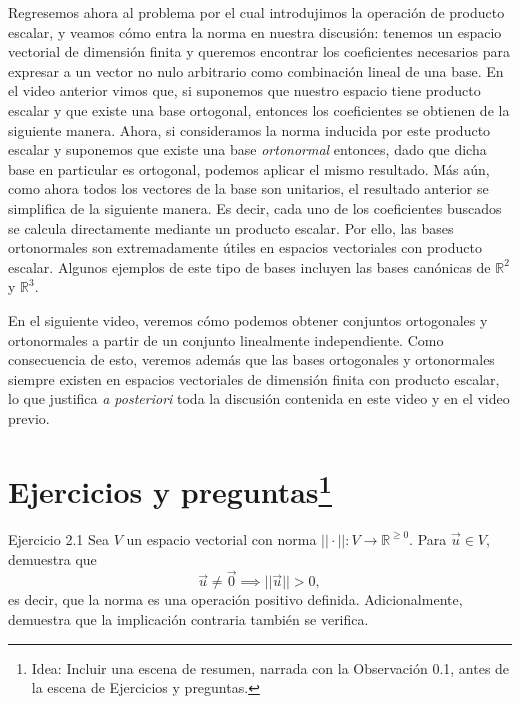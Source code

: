 \documentclass[12pt,dvipsnames]{article}
\numberwithin{equation}{section}
\begin{document}
Regresemos ahora al problema por el cual introdujimos la operación de producto escalar, y veamos cómo entra la norma en nuestra discusión: tenemos un espacio vectorial de dimensión finita y queremos encontrar los coeficientes necesarios para expresar a un vector no nulo arbitrario como combinación lineal de una base. En el video anterior vimos que, si suponemos que nuestro espacio tiene producto escalar y que existe una base ortogonal, entonces los coeficientes se obtienen de la siguiente manera. Ahora, si consideramos la norma inducida por este producto escalar y suponemos que existe una base \emph{ortonormal} entonces, dado que dicha base en particular es ortogonal, podemos aplicar el mismo resultado. Más aún, como ahora todos los vectores de la base son unitarios, el resultado anterior se simplifica de la siguiente manera. Es decir, cada uno de los coeficientes buscados se calcula directamente mediante un producto escalar. Por ello, las bases ortonormales son extremadamente útiles en espacios vectoriales con producto escalar. Algunos ejemplos de este tipo de bases incluyen las bases canónicas de $\mathbb{R}^2$ y $\mathbb{R}^3$. 

En el siguiente video, veremos cómo podemos obtener conjuntos ortogonales y ortonormales a partir de un conjunto linealmente independiente. Como consecuencia de esto, veremos además que las bases ortogonales y ortonormales siempre existen en espacios vectoriales de dimensión finita con producto escalar, lo que justifica \emph{a posteriori} toda la discusión contenida en este video y en el video previo.


\newpage
\section{Ejercicios y preguntas\footnote{Idea: Incluir una escena de resumen, narrada con la Observación 0.1, antes de la escena de Ejercicios y preguntas.}}


Ejercicio 2.1 Sea $V$ un espacio vectorial con norma $||\cdot||:V\to \mathbb{R}^{\geq0}$. Para $\vec{u}\in V$, demuestra que \[
    \vec{u} \neq \vec{0} \implies ||\vec{u}|| > 0,
\] 
es decir, que la norma es una operación positivo definida. Adicionalmente, demuestra que la implicación contraria también se verifica. \\
\end{document}
